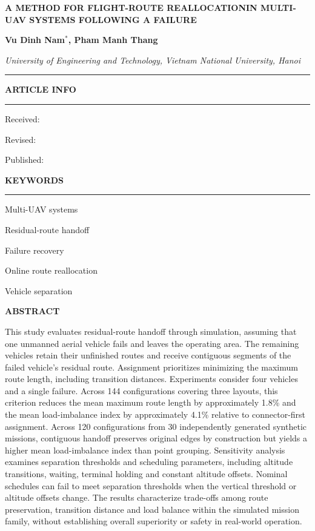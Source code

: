 \documentclass[11pt,a4paper]{article}
\newif\ifanonymous
\newcommand{\tnuinfoheading}[1]{%
  {\centering\fontsize{10}{11.5}\selectfont\bfseries #1\par}%
  \vspace{3pt}\hrule\vspace{4pt}}
\begin{document}
\begingroup\setlength{\parindent}{0pt}\raggedright
{\fontsize{12}{14}\selectfont\bfseries\MakeUppercase{A Method for Flight-Route Reallocation\newline in Multi-UAV Systems Following a Failure}\par}
\ifanonymous\else
\vspace{4pt}
{\fontsize{10}{11.5}\selectfont\bfseries Vu Dinh Nam$^{*}$, Pham Manh Thang\par}
{\fontsize{9}{10.5}\selectfont\itshape University of Engineering and Technology, Vietnam National University, Hanoi\par}
\fi
\endgroup
\vspace{6pt}\hrule\vspace{4pt}

\noindent
\begin{minipage}[t]{0.30\textwidth}
\raggedright\fontsize{10}{11.5}\selectfont
\tnuinfoheading{ARTICLE INFO}
{\raggedleft\fontsize{9}{10.5}\selectfont
Received:\par\vspace{6pt}
Revised:\par\vspace{6pt}
Published:\par}
\vspace{8pt}
\tnuinfoheading{KEYWORDS}
Multi-UAV systems\par
Residual-route handoff\par
Failure recovery\par
Online route reallocation\par
Vehicle separation
\end{minipage}\hfill
\begin{minipage}[t]{0.67\textwidth}
\fontsize{10}{11.5}\selectfont
\textbf{ABSTRACT}\par\vspace{4pt}
This study evaluates residual-route handoff through simulation, assuming that one unmanned aerial vehicle fails and leaves the operating area. The remaining vehicles retain their unfinished routes and receive contiguous segments of the failed vehicle's residual route. Assignment prioritizes minimizing the maximum route length, including transition distances. Experiments consider four vehicles and a single failure. Across 144 configurations covering three layouts, this criterion reduces the mean maximum route length by approximately 1.8\% and the mean load-imbalance index by approximately 4.1\% relative to connector-first assignment. Across 120 configurations from 30 independently generated synthetic missions, contiguous handoff preserves original edges by construction but yields a higher mean load-imbalance index than point grouping. Sensitivity analysis examines separation thresholds and scheduling parameters, including altitude transitions, waiting, terminal holding and constant altitude offsets. Nominal schedules can fail to meet separation thresholds when the vertical threshold or altitude offsets change. The results characterize trade-offs among route preservation, transition distance and load balance within the simulated mission family, without establishing overall superiority or safety in real-world operation.
\end{minipage}
\end{document}
